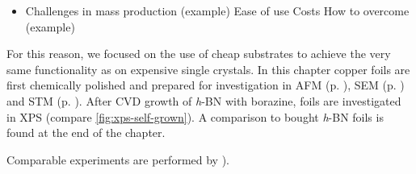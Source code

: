 \begin{itemize}	
	\item Challenges in mass production (example)
  	  \subitem Ease of use
 	  \subitem Costs
	    \subsubitem How to overcome (example)
\end{itemize}	

For this reason, we focused on the use of cheap substrates to achieve the very same functionality as on expensive single crystals. In this chapter copper foils are first chemically polished and prepared for investigation in AFM (p. \pageref{sec:foil-AFM}), SEM (p. \pageref{sec:foil-SEM}) and STM (p. \pageref{sec:foil-STM}). After CVD growth of \textit{h}-BN with borazine, foils are investigated in XPS (compare \autoref{fig:xps-self-grown}). A comparison to bought \textit{h}-BN foils is found at the end of the chapter.

Comparable experiments  are performed by \cite[8]{stables_report_2008}). 
